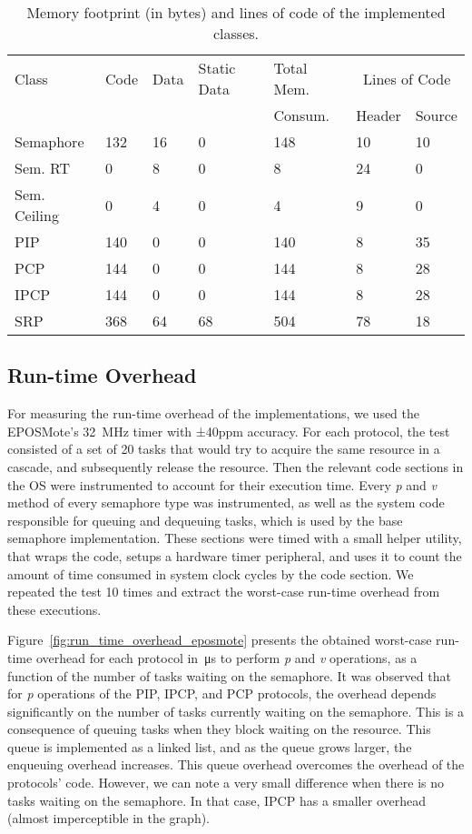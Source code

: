 \begin{table}[!ht]
\centering
\caption{Memory footprint (in bytes) and lines of code of the implemented 
classes.}
\begin{tabular}{l l l l l|l l}
Class	& Code &  Data & Static Data & Total Mem. & 
\multicolumn{2}{c}{Lines of Code} \\ 
			&	   &	   &			 &	Consum.	 & Header & Source \\
\hline
Semaphore 			& 132 & 16 & 0  & 148 & 10 & 10 \\ \hline
Sem. RT		 		& 0   & 8  & 0  & 8   & 24 & 0  \\ \hline
Sem. Ceiling	 	& 0   & 4  & 0  & 4   & 9  & 0  \\ \hline
PIP 				& 140   & 0  & 0  & 140   & 8  & 35 \\ \hline
PCP 				& 144  & 0  & 0  & 144  & 8  & 28 \\ \hline
IPCP 				& 144  & 0  & 0  & 144  & 8  & 28 \\ \hline
SRP 				& 368 & 64  & 68 & 504 & 78 & 18 \\ \hline
\end{tabular}
\label{tab:memory}
\end{table}

\subsection{Run-time Overhead}


For measuring the run-time overhead of the implementations, we used the  
EPOSMote’s 32~MHz timer with ±40ppm accuracy. For each protocol, the test 
consisted of a set of 20 tasks that would try to acquire the same resource in a 
cascade, and subsequently release the resource. Then the relevant code sections 
in the OS were instrumented to account for their execution time. Every 
\textit{p} and \textit{v} method of every semaphore type was instrumented, as 
well as the system code responsible for queuing and dequeuing tasks, which is 
used by the base semaphore implementation. These sections were timed 
with a small helper utility, that wraps the code, setups a hardware timer 
peripheral, and uses it to count the amount of time consumed in system clock 
cycles by the code section. We repeated the test 10 times and extract the 
worst-case run-time overhead from these executions.

Figure~\ref{fig:run_time_overhead_eposmote} presents the obtained 
worst-case run-time overhead for each protocol in~\si{\micro\second} to perform 
\textit{p} and \textit{v} operations, as a function of the number of tasks 
waiting on the semaphore. It was observed that for \textit{p} operations of the 
PIP, IPCP, and PCP protocols, the overhead depends significantly on the number 
of tasks currently waiting on the semaphore. This is a consequence of queuing 
tasks when they block waiting on the resource. This queue is implemented as a 
linked list, and as the queue grows larger, the enqueuing overhead increases. 
This queue overhead overcomes the overhead of the protocols' code. However, we 
can note a very small difference when there is no tasks waiting on the 
semaphore. In that case, IPCP has a smaller overhead (almost imperceptible in 
the graph).

